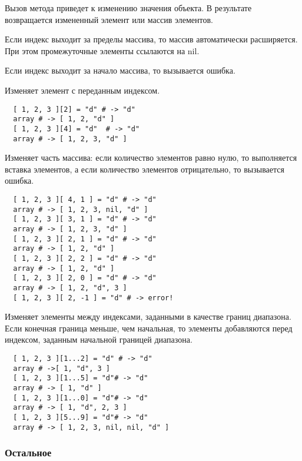 Вызов метода приведет к изменению значения объекта. В результате возвращается измененный элемент или массив элементов. 

Если индекс выходит за пределы массива, то массив автоматически расширяется. При этом промежуточные элементы ссылаются на nil. 

Если индекс выходит за начало массива, то вызывается ошибка. 

\begin{methodlist}
  Изменяет элемент с переданным индексом. 
  \begin{verbatim}
  [ 1, 2, 3 ][2] = "d" # -> "d" 
  array # -> [ 1, 2, "d" ] 
  [ 1, 2, 3 ][4] = "d"  # -> "d" 
  array # -> [ 1, 2, 3, "d" ]
  \end{verbatim}

  Изменяет часть массива: если количество элементов равно нулю, то выполняется вставка элементов, а если количество элементов отрицательно, то вызывается ошибка.
  \begin{verbatim}
  [ 1, 2, 3 ][ 4, 1 ] = "d" # -> "d" 
  array # -> [ 1, 2, 3, nil, "d" ] 
  [ 1, 2, 3 ][ 3, 1 ] = "d" # -> "d" 
  array # -> [ 1, 2, 3, "d" ] 
  [ 1, 2, 3 ][ 2, 1 ] = "d" # -> "d" 
  array # -> [ 1, 2, "d" ] 
  [ 1, 2, 3 ][ 2, 2 ] = "d" # -> "d" 
  array # -> [ 1, 2, "d" ] 
  [ 1, 2, 3 ][ 2, 0 ] = "d" # -> "d" 
  array # -> [ 1, 2, "d", 3 ] 
  [ 1, 2, 3 ][ 2, -1 ] = "d" # -> error!
  \end{verbatim}

  Изменяет элементы между индексами, заданными в качестве границ диапазона. 
  Если конечная граница меньше, чем начальная, то элементы добавляются перед индексом, заданным начальной границей диапазона.
  \begin{verbatim}
  [ 1, 2, 3 ][1...2] = "d" # -> "d" 
  array # ->[ 1, "d", 3 ] 
  [ 1, 2, 3 ][1...5] = "d"# -> "d" 
  array # -> [ 1, "d" ] 
  [ 1, 2, 3 ][1...0] = "d"# -> "d" 
  array # -> [ 1, "d", 2, 3 ] 
  [ 1, 2, 3 ][5...9] = "d"# -> "d" 
  array # -> [ 1, 2, 3, nil, nil, "d" ]
  \end{verbatim}
\end{methodlist}

\subsubsection*{Остальное}


